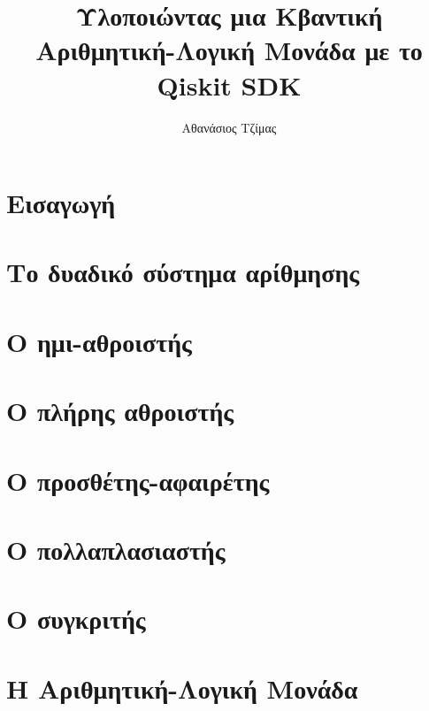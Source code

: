\documentclass[a4paper,11pt]{article}
\title{Υλοποιώντας μια Κβαντική Αριθμητική-Λογική Μονάδα με το Qiskit SDK}
\author{Αθανάσιος Τζίμας}
\begin{document}
\maketitle

\section{Εισαγωγή}

\section{Το δυαδικό σύστημα αρίθμησης}

\section{Ο ημι-αθροιστής}

\section{Ο πλήρης αθροιστής}

\section{Ο προσθέτης-αφαιρέτης}

\section{Ο πολλαπλασιαστής}

\section{Ο συγκριτής}

\section{Η Αριθμητική-Λογική Μονάδα}

\end{document}
